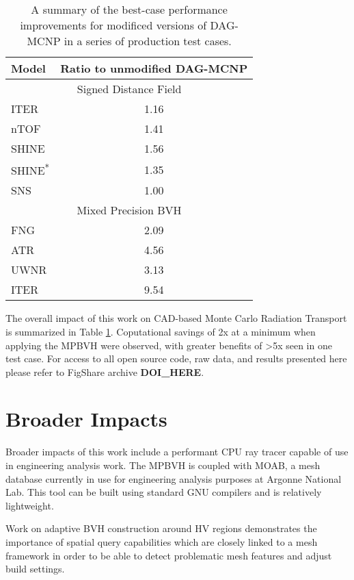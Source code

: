 \begin{table}[H]
  \small
  \centering
  \begin{tabular}{lc}
    \toprule
    Model & Ratio to unmodified DAG-MCNP \\
    \hline
    \multicolumn{2}{c}{Signed Distance Field} \\
    \hline
    ITER  & 1.16 \\
    nTOF  & 1.41 \\
    SHINE & 1.56 \\
    SHINE\textsuperscript{*} & 1.35 \\
    SNS   & 1.00 \\
    \hline
    \multicolumn{2}{c}{Mixed Precision BVH} \\
    \hline
    FNG  & 2.09  \\
    ATR  & 4.56  \\
    UWNR & 3.13  \\
    ITER & 9.54  \\
    \bottomrule
  \end{tabular}
  \caption[A summary of performance improvements in this work]{A summary of the
    best-case performance improvements for modificed versions of DAG-MCNP in a
    series of production test cases.}
  \label{tab:the_rub}
\end{table}

The overall impact of this work on CAD-based Monte Carlo Radiation Transport is
summarized in Table \ref{tab:the_rub}. Coputational savings of 2x at a minimum
when applying the MPBVH were observed, with greater benefits of >5x seen in one
test case. For access to all open source code, raw data, and results presented
here please refer to FigShare archive \textbf{DOI\_HERE}.

\section{Broader Impacts}\label{sec:other_contrib}

Broader impacts of this work include a performant CPU ray tracer capable of
use in engineering analysis work. The MPBVH is coupled with MOAB, a mesh
database currently in use for engineering analysis purposes at Argonne National
Lab. This tool can be built using standard GNU compilers and is relatively
lightweight.

Work on adaptive BVH construction around HV regions demonstrates the importance
of spatial query capabilities which are closely linked to a mesh framework in
order to be able to detect problematic mesh features and adjust build settings.

